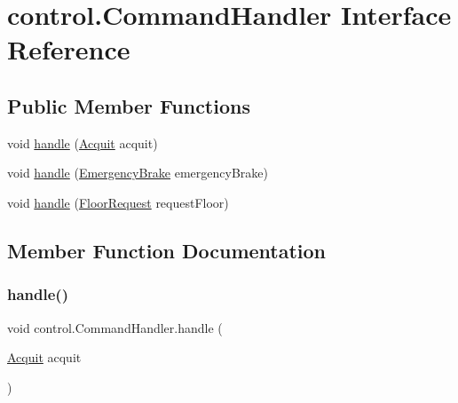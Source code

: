 \hypertarget{interfacecontrol_1_1_command_handler}{}\section{control.\+Command\+Handler Interface Reference}
\label{interfacecontrol_1_1_command_handler}
\subsection*{Public Member Functions}
\begin{DoxyCompactItemize}
\item 
void \mbox{\hyperlink{interfacecontrol_1_1_command_handler_aa96126615b93e14e83059c375e3a343c}{handle}} (\mbox{\hyperlink{classcontrol_1_1command_1_1_acquit}{Acquit}} acquit)
\item 
void \mbox{\hyperlink{interfacecontrol_1_1_command_handler_a3e25f07c8c8ed0c33481a048d203f45e}{handle}} (\mbox{\hyperlink{classcontrol_1_1command_1_1_emergency_brake}{Emergency\+Brake}} emergency\+Brake)
\item 
void \mbox{\hyperlink{interfacecontrol_1_1_command_handler_aff045a0f45642a078867df097c10eb22}{handle}} (\mbox{\hyperlink{classcontrol_1_1command_1_1_floor_request}{Floor\+Request}} request\+Floor)
\end{DoxyCompactItemize}


\subsection{Member Function Documentation}
\mbox{\label{interfacecontrol_1_1_command_handler_aa96126615b93e14e83059c375e3a343c}} 
\subsubsection{\texorpdfstring{handle()}{handle()}\hspace{0.1cm}{\footnotesize\ttfamily [1/3]}}
{\footnotesize\ttfamily void control.\+Command\+Handler.\+handle (\begin{DoxyParamCaption}\item[{\mbox{\hyperlink{classcontrol_1_1command_1_1_acquit}{Acquit}}}]{acquit }\end{DoxyParamCaption})}

